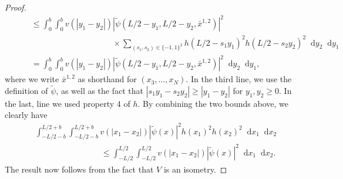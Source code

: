 \documentclass[a4paper,11pt]{article}
\newcommand{\abs}[1]{\left\lvert #1 \right\rvert}
\newcommand*\diff{\mathop{}\!\mathrm{d}}
\numberwithin{equation}{section}
\begin{document}
\begin{proof}
\begin{equation}
\begin{aligned}
				&\quad\quad\leq \int_{0}^{b}\int_{0}^{b}v(\abs{y_1-y_2})\abs{\tilde{\psi}(L/2-y_1,L/2- y_2,\bar{x}^{1,2})}^2\\&\hspace{5cm}\times\sum_{(s_1,s_2)\in\{-1,1\}^2}h(L/2-s_1 y_1)^2h(L/2-s_2 y_2)^2\diff y_2\diff y_1\\
				&\quad\quad=\int_{0}^{b}\int_{0}^{b}v(\abs{y_1-y_2})\abs{\tilde{\psi}(L/2-y_1,L/2- y_2,\bar{x}^{1,2})}^2\diff y_2\diff y_1,
			\end{aligned}
		\end{equation}
		where we write $\bar{x}^{1,2}$ as shorthand for $ (x_3,\dots, x_N)$.
		In the third line, we use the definition of $ \tilde{\psi} $, as well as the fact that $ \abs{s_1y_1-s_2y_2}\geq \abs{y_1-y_2} $ for $ y_1,y_2\geq 0 $. In the last, line we used property 4 of $ h $.
		By combining the two bounds above, we clearly have 
		\begin{equation}
			\begin{aligned}
				&\int_{-L/2-b}^{L/2+b}\int_{-L/2-b}^{L/2+b}v(\abs{x_1-x_2})\abs{\tilde{\psi}(x)}^2h(x_1)^2h(x_2)^2\diff x_1\diff x_2\\&\qquad\qquad\qquad\qquad \leq \int_{-L/2}^{L/2}\int_{-L/2}^{L/2}v(\abs{x_1-x_2})\abs{\tilde{\psi}(x)}^2\diff x_1\diff x_2.
			\end{aligned}
		\end{equation}
		The result now follows from the fact that $ V $ is an isometry.
	\end{proof}
\end{document}
